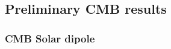 \documentclass[twocolumn]{../../common/aa}
\begin{document}


\subsection{Preliminary CMB results}
\label{sec:cmb}

\subsubsection{CMB Solar dipole}
\label{sec:dipole}
\end{document}
